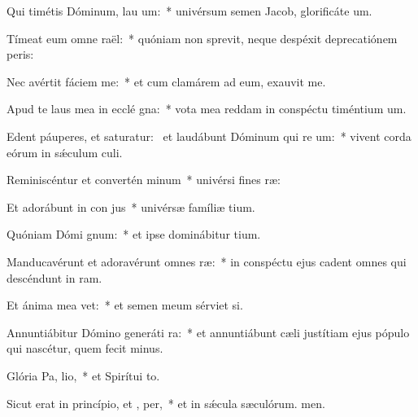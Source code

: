 \item Qui timétis Dóminum, lau um:~* univérsum semen Jacob, glorificáte um.
\item Tímeat eum omne  raël:~* quóniam non sprevit, neque despéxit deprecatiónem peris:
\item Nec avértit fáciem   me:~* et cum clamárem ad eum, exauvit me.
\item Apud te laus mea in ecclé gna:~* vota mea reddam in conspéctu timéntium um.
\item Edent páuperes, et saturatur:~\pscross{} et laudábunt Dóminum qui re um:~* vivent corda eórum in sǽculum culi.
\item Reminiscéntur et convertén  minum~* univérsi fines ræ:
\item Et adorábunt in con jus~* univérsæ famíliæ tium.
\item Quóniam Dómi  gnum:~* et ipse dominábitur tium.
\item Manducavérunt et adoravérunt omnes  ræ:~* in conspéctu ejus cadent omnes qui descéndunt in ram.
\item Et ánima mea  vet:~* et semen meum sérviet si.
\item Annuntiábitur Dómino generáti ra:~* et annuntiábunt cæli justítiam ejus pópulo qui nascétur, quem fecit minus.
\item Glória Pa,  lio,~* et Spirítui to.
\item Sicut erat in princípio, et ,  per,~* et in sǽcula sæculórum. men.
